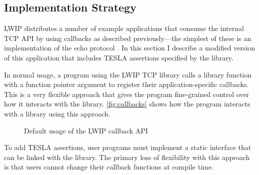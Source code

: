 \subsection{Implementation Strategy}

LWIP distributes a number of example applications that consume the internal TCP
API by using callbacks as described previously---the simplest of these is an
implementation of the echo protocol \cite{RFC0862}. In this section I describe a
modified version of this application that includes TESLA assertions specified by
the library.

In normal usage, a program using the LWIP TCP library calls a library function
with a function pointer argument to register their application-specific
callbacks. This is a very flexible approach that gives the program fine-grained
control over how it interacts with the library. \autoref{fig:callbacks} shows
how the program interacts with a library using this approach.

\begin{figure}[ht]
  \centering
  \caption{Default usage of the LWIP callback API}
  \label{fig:callbacks}
\end{figure}

To add TESLA assertions, user programs must implement a static interface that
can be linked with the library. The primary loss of flexibility with this approach
is that users cannot change their callback functions at compile time.

